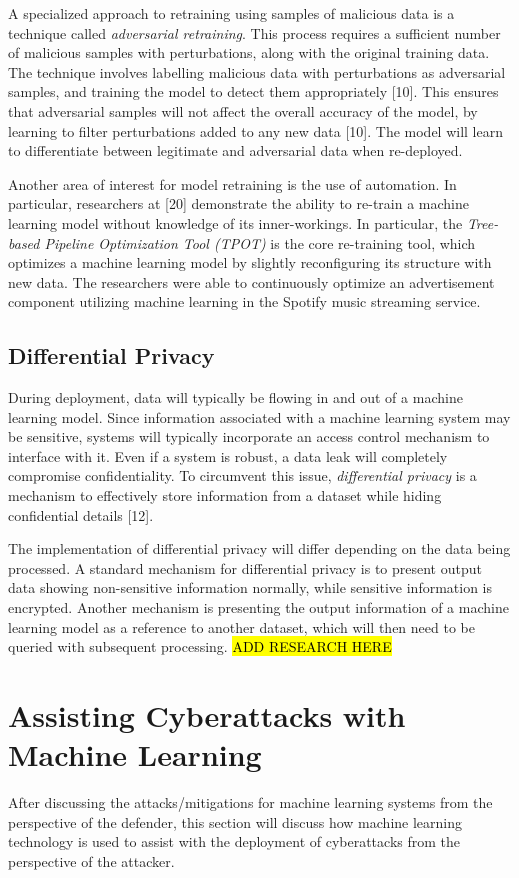 \documentclass[11pt,conference]{IEEEtran}
\begin{document}
A specialized approach to retraining using samples of malicious data is a technique called
\emph{adversarial retraining}. This process requires  
a sufficient number of malicious samples with perturbations, along with the
original training data. The technique
involves labelling malicious data with perturbations as adversarial samples, and training
the model to detect them appropriately [10]. This ensures that adversarial samples will not affect
the overall accuracy of the model, by learning to filter perturbations added to
any new data [10]. The model will learn to differentiate between legitimate and
adversarial data when re-deployed.

Another area of interest for model retraining is the use of automation. In
particular, researchers at [20] demonstrate the ability to re-train a
machine learning model without knowledge of its inner-workings. In particular,
the \emph{Tree-based Pipeline Optimization Tool (TPOT)} is the core re-training
tool, which optimizes a machine learning model by slightly reconfiguring its
structure with new data. The researchers were able to continuously optimize an
advertisement component utilizing machine learning in the Spotify music
streaming service.

\subsection{Differential Privacy}
During deployment, data will typically be flowing in and out of a machine
learning model. Since information associated with a machine learning system may be
sensitive, systems will typically incorporate an access control mechanism to interface with it. Even if a system
is robust, a data leak will completely compromise confidentiality. To
circumvent this issue, \emph{differential privacy} is a mechanism to
effectively store
information from a dataset while hiding confidential details [12].

The implementation of differential privacy will differ depending on the data
being processed. A standard mechanism for differential privacy is to present
output data showing non-sensitive information normally, while sensitive
information is encrypted. Another mechanism is presenting the output
information of a machine learning model as a reference to another dataset, which
will then need to be queried with subsequent processing.
\hl{ADD RESEARCH HERE}

\section{Assisting Cyberattacks with Machine Learning}
After discussing the attacks/mitigations for machine learning systems
from the perspective of the defender, this section will discuss how machine
learning technology is used to assist with the deployment of cyberattacks from
the perspective of the attacker.
\end{document}
